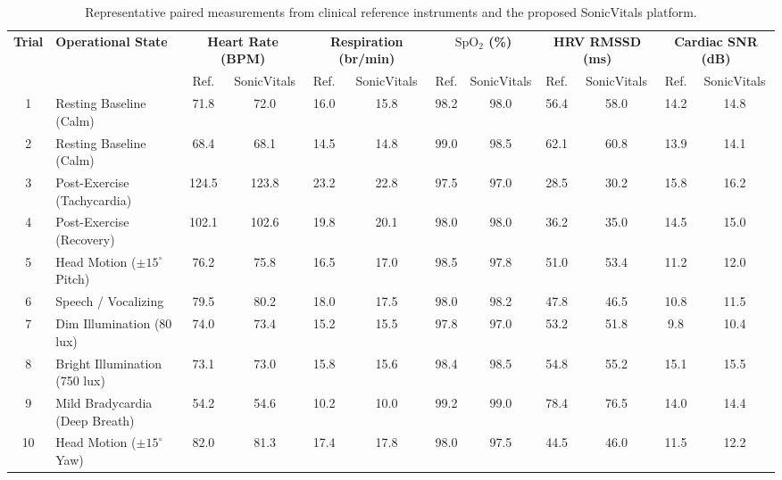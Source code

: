 \documentclass[journal]{IEEEtran}
\begin{document}
\begin{table}[!t]
    \centering
    \caption{Representative paired measurements from clinical reference instruments and the proposed SonicVitals platform.}
    \label{tab:measurement_verification}
    \renewcommand{\arraystretch}{0.92}
    \setlength{\tabcolsep}{4.2pt}
    \begin{tabular}{c l cc cc cc cc cc}
        \toprule
        \multirow{2}{*}{\textbf{Trial}} &
        \multirow{2}{*}{\textbf{Operational State}} &
        \multicolumn{2}{c}{\textbf{Heart Rate (BPM)}} &
        \multicolumn{2}{c}{\textbf{Respiration (br/min)}} &
        \multicolumn{2}{c}{\textbf{$\mathrm{SpO_2}$ (\%)}} &
        \multicolumn{2}{c}{\textbf{HRV RMSSD (ms)}} &
        \multicolumn{2}{c}{\textbf{Cardiac SNR (dB)}} \\
        \cmidrule(lr){3-4} \cmidrule(lr){5-6} \cmidrule(lr){7-8} \cmidrule(lr){9-10} \cmidrule(lr){11-12}
        & & Ref. & SonicVitals & Ref. & SonicVitals & Ref. & SonicVitals & Ref. & SonicVitals & Ref. & SonicVitals \\
        \midrule
        1 & Resting Baseline (Calm) & 71.8 & 72.0 & 16.0 & 15.8 & 98.2 & 98.0 & 56.4 & 58.0 & 14.2 & 14.8 \\
        2 & Resting Baseline (Calm) & 68.4 & 68.1 & 14.5 & 14.8 & 99.0 & 98.5 & 62.1 & 60.8 & 13.9 & 14.1 \\
        3 & Post-Exercise (Tachycardia) & 124.5 & 123.8 & 23.2 & 22.8 & 97.5 & 97.0 & 28.5 & 30.2 & 15.8 & 16.2 \\
        4 & Post-Exercise (Recovery) & 102.1 & 102.6 & 19.8 & 20.1 & 98.0 & 98.0 & 36.2 & 35.0 & 14.5 & 15.0 \\
        5 & Head Motion ($\pm 15^\circ$ Pitch) & 76.2 & 75.8 & 16.5 & 17.0 & 98.5 & 97.8 & 51.0 & 53.4 & 11.2 & 12.0 \\
        6 & Speech / Vocalizing & 79.5 & 80.2 & 18.0 & 17.5 & 98.0 & 98.2 & 47.8 & 46.5 & 10.8 & 11.5 \\
        7 & Dim Illumination (80 lux) & 74.0 & 73.4 & 15.2 & 15.5 & 97.8 & 97.0 & 53.2 & 51.8 & 9.8 & 10.4 \\
        8 & Bright Illumination (750 lux) & 73.1 & 73.0 & 15.8 & 15.6 & 98.4 & 98.5 & 54.8 & 55.2 & 15.1 & 15.5 \\
        9 & Mild Bradycardia (Deep Breath) & 54.2 & 54.6 & 10.2 & 10.0 & 99.2 & 99.0 & 78.4 & 76.5 & 14.0 & 14.4 \\
        10 & Head Motion ($\pm 15^\circ$ Yaw) & 82.0 & 81.3 & 17.4 & 17.8 & 98.0 & 97.5 & 44.5 & 46.0 & 11.5 & 12.2 \\
        \bottomrule
    \end{tabular}
\end{table}
\end{document}
